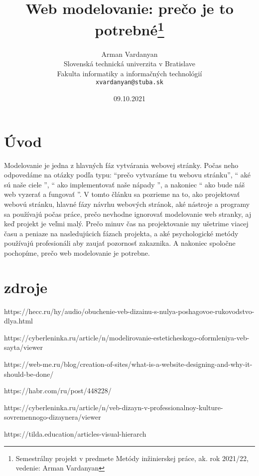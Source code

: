 \documentclass[10pt,twoside,slovak,a4paper]{article}
\title{Web modelovanie: prečo je to potrebné\thanks{Semestrálny projekt v predmete Metódy inžinierskej práce, ak. rok 2021/22, vedenie: Arman Vardanyan}} %
\author{Arman Vardanyan\\[2pt]
	{\small Slovenská technická univerzita v Bratislave}\\
	{\small Fakulta informatiky a informačných technológií}\\
	{\small \texttt{xvardanyan@stuba.sk}}
	}
\date{\small 09.10.2021} %
\begin{document}
\maketitle

\begin{center}
    
\end{center}

\section{Úvod}

Modelovanie je jedna z hlavných fáz vytvárania webovej stránky. Počas neho odpovedáme na otázky podľa typu: “prečo vytvaráme tu webovu stránku”, “ aké sú naše ciele ”, “ ako implementovať naše nápady ”, a nakoniec “ ako bude náš web vyzerať a fungovať ”. V tomto článku sa pozrieme na to, ako projektovať webovú stránku, hlavné fázy návrhu webových stránok, aké nástroje a programy sa používajú počas práce, prečo nevhodne ignorovať modelovanie web stranky, aj keď projekt je veľmi malý. Prečo minuv čas na projektovanie my ušetrime viacej času a peniaze na nasledujúcich fázach projekta, a aké psychologické metódy používajú profesionáli aby zaujať pozornosť zakaznika. A nakoniec spoločne pochopíme, prečo web modelovanie je potrebne.

\section{zdroje}

https://hecc.ru/hy/audio/obuchenie-veb-dizainu-s-nulya-poshagovoe-rukovodstvo-dlya.html

https://cyberleninka.ru/article/n/modelirovanie-esteticheskogo-oformleniya-veb-sayta/viewer

https://web-me.ru/blog/creation-of-sites/what-is-a-website-designing-and-why-it-should-be-done/

https://habr.com/ru/post/448228/

https://cyberleninka.ru/article/n/veb-dizayn-v-professionalnoy-kulture-sovremennogo-dizaynera/viewer

https://tilda.education/articles-visual-hierarch
\end{document}
